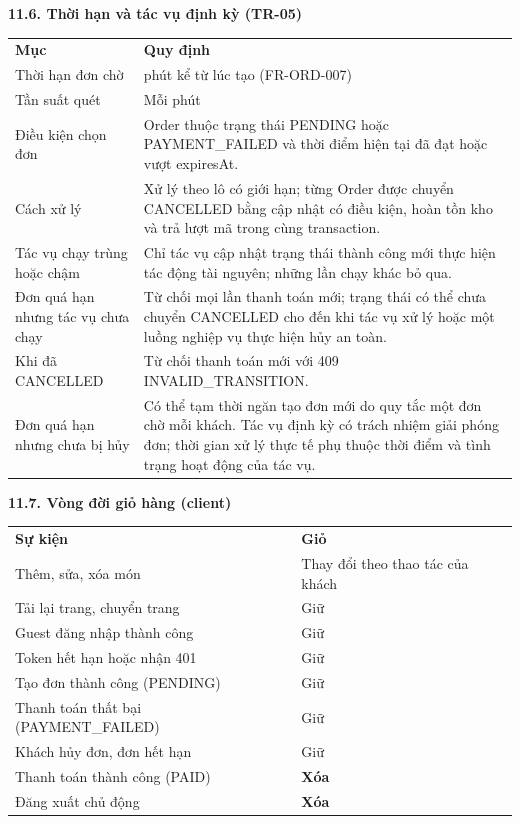 \documentclass[11pt,a4paper,oneside]{report}
\begin{document}
\textbf{11.6. Thời hạn và tác vụ định kỳ (TR-05)}

\begin{longtable}[]{@{}
  >{\raggedright\arraybackslash}p{}
  >{\raggedright\arraybackslash}p{}@{}}
\toprule\noalign{}
\endhead
\bottomrule\noalign{}
\endlastfoot
\textbf{Mục} & \textbf{Quy định} \\
Thời hạn đơn chờ & 15 phút kể từ lúc tạo (FR-ORD-007) \\
Tần suất quét & Mỗi phút \\
Điều kiện chọn đơn & Order thuộc trạng thái PENDING hoặc PAYMENT\_FAILED và thời điểm hiện tại đã đạt hoặc vượt expiresAt. \\
Cách xử lý & Xử lý theo lô có giới hạn; từng Order được chuyển CANCELLED bằng cập nhật có điều kiện, hoàn tồn kho và trả lượt mã trong cùng transaction. \\
Tác vụ chạy trùng hoặc chậm & Chỉ tác vụ cập nhật trạng thái thành công mới thực hiện tác động tài nguyên; những lần chạy khác bỏ qua. \\
Đơn quá hạn nhưng tác vụ chưa chạy & Từ chối mọi lần thanh toán mới; trạng thái có thể chưa chuyển CANCELLED cho đến khi tác vụ xử lý hoặc một luồng nghiệp vụ thực hiện hủy an toàn. \\
Khi đã CANCELLED & Từ chối thanh toán mới với 409 INVALID\_TRANSITION. \\
Đơn quá hạn nhưng chưa bị hủy & Có thể tạm thời ngăn tạo đơn mới do quy tắc một đơn chờ mỗi khách. Tác vụ định kỳ có trách nhiệm giải phóng đơn; thời gian xử lý thực tế phụ thuộc thời điểm và tình trạng hoạt động của tác vụ. \\
\end{longtable}

\textbf{11.7. Vòng đời giỏ hàng (client)}

\begin{longtable}[]{@{}
  >{\raggedright\arraybackslash}p{}
  >{\raggedright\arraybackslash}p{}@{}}
\toprule\noalign{}
\endhead
\bottomrule\noalign{}
\endlastfoot
\textbf{Sự kiện} & \textbf{Giỏ} \\
Thêm, sửa, xóa món & Thay đổi theo thao tác của khách \\
Tải lại trang, chuyển trang & Giữ \\
Guest đăng nhập thành công & Giữ \\
Token hết hạn hoặc nhận 401 & Giữ \\
Tạo đơn thành công (PENDING) & Giữ \\
Thanh toán thất bại (PAYMENT\_FAILED) & Giữ \\
Khách hủy đơn, đơn hết hạn & Giữ \\
Thanh toán thành công (PAID) & \textbf{Xóa} \\
Đăng xuất chủ động & \textbf{Xóa} \\
\end{longtable}
\end{document}
